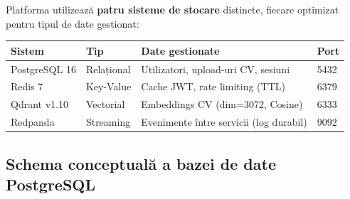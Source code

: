 \documentclass[12pt, a4paper]{report}
\begin{document}
Platforma utilizează \textbf{patru sisteme de stocare} distincte, fiecare optimizat
pentru tipul de date gestionat:

\begin{center}
\begin{tabularx}{\textwidth}{llXl}
\toprule
\rowcolor{primary!15}
\textbf{Sistem} & \textbf{Tip} & \textbf{Date gestionate} & \textbf{Port} \\
\midrule
PostgreSQL 16 & Relațional & Utilizatori, upload-uri CV, sesiuni & 5432 \\
Redis 7 & Key-Value & Cache JWT, rate limiting (TTL) & 6379 \\
Qdrant v1.10 & Vectorial & Embeddings CV (dim=3072, Cosine) & 6333 \\
Redpanda & Streaming & Evenimente între servicii (log durabil) & 9092 \\
\bottomrule
\end{tabularx}
\end{center}

\subsection{Schema conceptuală a bazei de date PostgreSQL}
\end{document}
